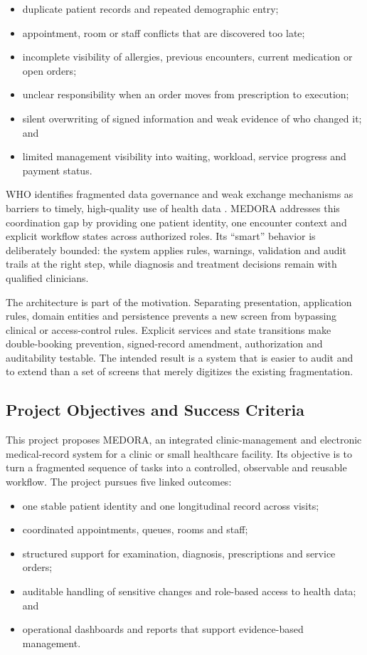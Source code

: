 \documentclass[a4paper,12pt]{article}
\begin{document}
\begin{itemize}[leftmargin=1.4em]
    \item duplicate patient records and repeated demographic entry;
    \item appointment, room or staff conflicts that are discovered too late;
    \item incomplete visibility of allergies, previous encounters, current medication or open orders;
    \item unclear responsibility when an order moves from prescription to execution;
    \item silent overwriting of signed information and weak evidence of who changed it; and
    \item limited management visibility into waiting, workload, service progress and payment status.
\end{itemize}

WHO identifies fragmented data governance and weak exchange mechanisms as barriers to timely, high-quality use of health data \citep{WHO2021DataGovernance}. MEDORA addresses this coordination gap by providing one patient identity, one encounter context and explicit workflow states across authorized roles. Its ``smart'' behavior is deliberately bounded: the system applies rules, warnings, validation and audit trails at the right step, while diagnosis and treatment decisions remain with qualified clinicians.

The architecture is part of the motivation. Separating presentation, application rules, domain entities and persistence prevents a new screen from bypassing clinical or access-control rules. Explicit services and state transitions make double-booking prevention, signed-record amendment, authorization and auditability testable. The intended result is a system that is easier to audit and to extend than a set of screens that merely digitizes the existing fragmentation.

\subsection{Project Objectives and Success Criteria}
This project proposes MEDORA, an integrated clinic-management and electronic medical-record system for a clinic or small healthcare facility. Its objective is to turn a fragmented sequence of tasks into a controlled, observable and reusable workflow. The project pursues five linked outcomes:

\begin{itemize}[leftmargin=1.4em]
    \item one stable patient identity and one longitudinal record across visits;
    \item coordinated appointments, queues, rooms and staff;
    \item structured support for examination, diagnosis, prescriptions and service orders;
    \item auditable handling of sensitive changes and role-based access to health data; and
    \item operational dashboards and reports that support evidence-based management.
\end{itemize}
\end{document}
